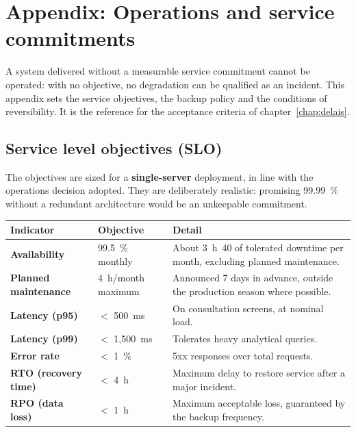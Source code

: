 
\chapter{Appendix: Operations and service commitments}
\label{chap:exploitation}
A system delivered without a measurable service commitment cannot be operated:
with no objective, no degradation can be qualified as an incident. This appendix
sets the service objectives, the backup policy and the conditions of
reversibility. It is the reference for the acceptance criteria of
chapter~\ref{chap:delais}.

\section{Service level objectives (SLO)}
The objectives are sized for a \textbf{single-server} deployment, in line with
the operations decision adopted. They are deliberately realistic: promising
99.99~\% without a redundant architecture would be an unkeepable commitment.

\begin{xltabular}{\textwidth}{>{\bfseries}p{4.2cm} p{3.4cm} X}
\toprule
\textbf{Indicator} & \textbf{Objective} & \textbf{Detail} \\
\midrule
\endhead
Availability & 99.5~\% monthly & About 3~h~40 of tolerated downtime per month, excluding planned maintenance. \\
\addlinespace
Planned maintenance & 4~h/month maximum & Announced 7 days in advance, outside the production season where possible. \\
\addlinespace
Latency (p95) & $<$ 500~ms & On consultation screens, at nominal load. \\
\addlinespace
Latency (p99) & $<$ 1,500~ms & Tolerates heavy analytical queries. \\
\addlinespace
Error rate & $<$ 1~\% & 5xx responses over total requests. \\
\addlinespace
\textbf{RTO} (recovery time) & $<$ 4~h & Maximum delay to restore service after a major incident. \\
\addlinespace
\textbf{RPO} (data loss) & $<$ 1~h & Maximum acceptable loss, guaranteed by the backup frequency. \\
\bottomrule
\end{xltabular}

